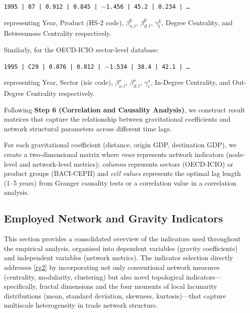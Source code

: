 \documentclass[preprint, 3p,
authoryear]{elsarticle} %
\begin{document}
\begin{center}
\texttt{1995 | 87 | 0.912 | 0.845 | $-$1.456 | 45.2 | 0.234 | \ldots}
\end{center}

\noindent representing Year, Product (HS-2 code), \(\beta_{o,t}^{k}\),
\(\beta_{d,t}^{k}\), \(\gamma_t^{k}\), Degree Centrality, and
Betweenness Centrality respectively.

Similarly, for the OECD-ICIO sector-level database:

\begin{center}
\texttt{1995 | C29 | 0.876 | 0.812 | $-$1.534 | 38.4 | 42.1 | \ldots}
\end{center}

\noindent representing Year, Sector (\gls{isic} code),
\(\beta_{o,t}^{s}\), \(\beta_{d,t}^{s}\), \(\gamma_t^{s}\), In-Degree
Centrality, and Out-Degree Centrality respectively.

Following \textbf{Step 6 (Correlation and Causality Analysis)}, we
construct result matrices that capture the relationship between
gravitational coefficients and network structural parameters across
different time lags.

For each gravitational coefficient (distance, origin GDP, destination
GDP), we create a two-dimensional matrix where \emph{rows} represents
network indicators (node-level and network-level metrics);
\emph{columns} represents sectors (OECD-ICIO) or product groups
(BACI-CEPII) and \emph{cell values} represents the optimal lag length
(1--5 years) from Granger causality tests or a correlation value in a
correlation analysis.

\subsection{Employed Network and Gravity
Indicators}\label{sec:indicators}

This section provides a consolidated overview of the indicators used
throughout the empirical analysis, organised into dependent variables
(gravity coefficients) and independent variables (network metrics). The
indicator selection directly addresses \ref{rg2} by incorporating not
only conventional network measures (centrality, modularity, clustering)
but also novel topological indicators---specifically, fractal dimensions
and the four moments of local lacunarity distributions (mean, standard
deviation, skewness, kurtosis)---that capture multiscale heterogeneity
in trade network structure.
\end{document}
